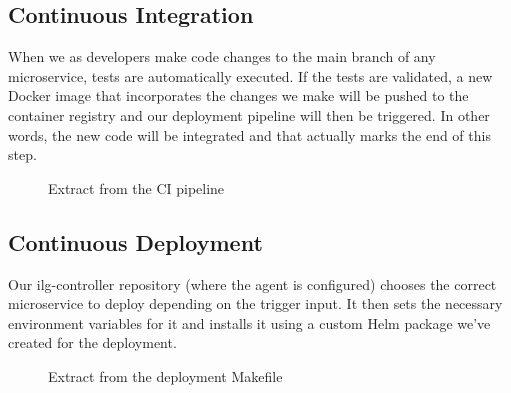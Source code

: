 \subsection{Continuous Integration}
When we as developers make code changes to the main branch of any microservice, tests are automatically executed.
If the tests are validated, a new Docker image that incorporates the changes we make will be pushed to the container registry and our deployment pipeline will then be triggered.
In other words, the new code will be integrated and that actually marks the end of this step.
\begin{figure}[H]
    \centering
    \caption{Extract from the CI pipeline}
    \label{fig:extract-from-ci-pipeline}
\end{figure}

\subsection{Continuous Deployment}
Our ilg-controller repository (where the agent is configured) chooses the correct microservice to deploy depending on the trigger input.
It then sets the necessary environment variables for it and installs it using a custom Helm package we've created for the deployment.

\begin{figure}[H]
    \centering
    \caption{Extract from the deployment Makefile}
    \label{fig:extract-from-cd-makefile}
\end{figure}

